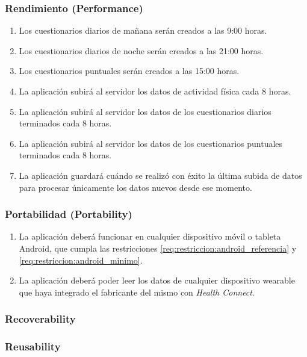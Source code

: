         \subsubsection{Rendimiento (Performance)}
            \begin{enumerate}[resume, label=\textbf{\texttt{RNF-\arabic*}}]
                \item Los cuestionarios diarios de mañana serán creados a las 9:00 horas.
                \item Los cuestionarios diarios de noche serán creados a las 21:00 horas.
                \item Los cuestionarios puntuales serán creados a las 15:00 horas.
                \item La aplicación subirá al servidor los datos de actividad física cada 8 horas.
                \item La aplicación subirá al servidor los datos de los cuestionarios diarios terminados cada 8 horas.
                \item La aplicación subirá al servidor los datos de los cuestionarios puntuales terminados cada 8 horas.
                \item La aplicación guardará cuándo se realizó con éxito la última subida de datos para procesar únicamente los datos nuevos desde ese momento.
            \end{enumerate}
        \subsubsection{Portabilidad (Portability)}
            \begin{enumerate}[resume, label=\textbf{\texttt{RNF-\arabic*}}]
                \item La aplicación deberá funcionar en cualquier dispositivo móvil o tableta Android, que cumpla las restricciones \ref{req:restriccion:android_referencia} y \ref{req:restriccion:android_minimo}.
                \item La aplicación deberá poder leer los datos de cualquier dispositivo \gls{wearable} que haya integrado el fabricante del mismo con \textit{Health Connect}.
            \end{enumerate}
        \subsubsection{Recoverability}
        \subsubsection{Reusability}
